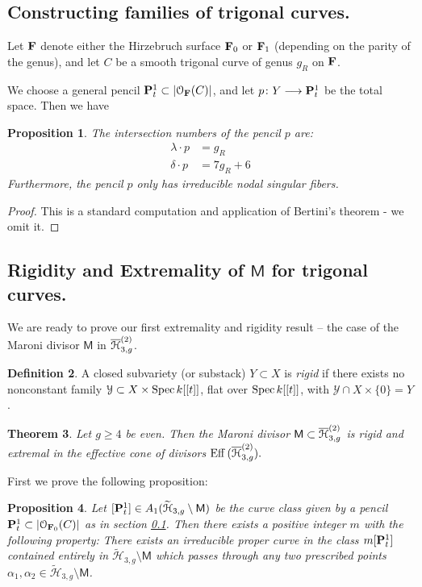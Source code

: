\documentclass[reqno, 10 pt]{article}
\newtheorem{thm}{Theorem}
\newtheorem{prop}[thm]{Proposition}
\theoremstyle{definition}
\newtheorem{defn}[thm]{Definition}
\theoremstyle{remark}
\numberwithin{equation}{section}
\numberwithin{thm}{section}
\numberwithin{prop}{section}
\numberwithin{lem}{section}
\numberwithin{cor}{section}
\numberwithin{conj}{section}
\numberwithin{defn}{section}
\renewcommand{\H}{\mathcal H}
\newcommand{\td}{\widetilde}
\newcommand{\F}{{\mathbf F}}
\renewcommand{\to}{\longrightarrow}
\newcommand{\sfM}{{\mathsf M}}
\newcommand{\cO}{{\mathcal O}}
\newcommand{\cY}{{\mathcal Y}}
\renewcommand{\P}{{\bf P}}
\renewcommand{\F}{{\bf F}}
\newcommand {\from}{{\colon}}
\renewcommand{\H}{{\mathcal{H}}}
\newcommand{\Spec}{{\text{\rm Spec}\,}}
\newcommand {\Eff}{{\rm Eff}\,}
\begin{document}
\subsection{Constructing families of trigonal curves.} \label{BasicTrigonalFamilies} Let $\F$ denote either the Hirzebruch surface $\F_{0}$ or $\F_{1}$ (depending on the parity of the genus), and let $C$ be a smooth trigonal curve of genus $g_{R}$ on $\F$.  

We choose a general pencil $\P^{1}_{t} \subset |\cO_{\F}(C)|$, and let $p \from Y \to \P^{1}_{t}$ be the total space.  Then we have
\begin{prop}\label{trignum}
The intersection numbers of the pencil $p$ are:
\begin{align*}
\lambda \cdot p &= g_{R} \\
\delta \cdot p &= 7g_{R} + 6
\end{align*}
Furthermore, the pencil $p$ only has irreducible nodal singular fibers.
\end{prop}

\begin{proof}
This is a standard computation and application of Bertini's theorem - we omit it. 
\end{proof}

\subsection{Rigidity and Extremality of $\sfM$ for trigonal curves.}
We are ready to prove our first extremality and rigidity result -- the case of the Maroni divisor $\sfM$ in $\o{\H}^{(2)}_{3,g}$. 

\begin{defn}\label{rigid}
A closed subvariety (or substack) $Y \subset X$ is {\sl rigid} if there exists no nonconstant family $\mathcal{\cY} \subset X \times \Spec k[[t]]$, flat over $\Spec k[[t]]$, with $\cY \cap X \times \{0\} = Y$.
\end{defn}

\begin{thm}\label{Mextremal3}
Let $g \geq 4$ be even.  Then the Maroni divisor $\sfM \subset \o{\H}^{(2)}_{3,g}$ is rigid and extremal in the effective cone of divisors $\Eff (\overline{\H}^{(2)}_{3,g}).$
\end{thm}

First we prove the following proposition:

\begin{prop}\label{prop:flexiblethree}
Let $[\P^{1}_{t}] \in A_{1}(\td{\H}_{3,g} \setminus \sfM)$ be the curve class given by a pencil $\P^{1}_{t} \subset |\cO_{\F_{0}}(C)|$ as in section \ref{BasicTrigonalFamilies}. Then there exists a positive integer $m$ with the following property: There exists an irreducible proper curve in the class $m[\P^{1}_{t}]$ contained entirely in $\td{\H}_{3,g} \setminus \sfM $ which passes through any two prescribed points $\alpha_{1}, \alpha_{2} \in \td{\H}_{3,g} \setminus \sfM$.
\end{prop} 
\end{document}
